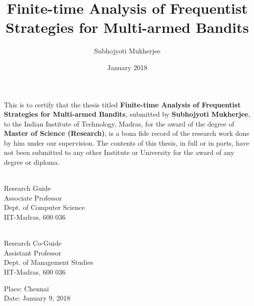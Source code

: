 \documentclass[MS,twoside]{iitmdiss}
\newcommand{\clearemptydoublepage}{\newpage{\cleardoublepage}}
\begin{document}

\title{Finite-time Analysis of Frequentist Strategies for Multi-armed Bandits}

\author{Subhojyoti Mukherjee}

\date{January 2018}

\maketitle



\clearemptydoublepage
\certificate

\vspace*{0.5in}

\noindent This is to certify that the thesis titled {\bf Finite-time Analysis of Frequentist Strategies for Multi-armed Bandits}, submitted by {\bf Subhojyoti Mukherjee}, 
  to the Indian Institute of Technology, Madras, for
the award of the degree of {\bf Master of Science (Research)}, is a bona fide
record of the research work done by him under our supervision.  The
contents of this thesis, in full or in parts, have not been submitted
to any other Institute or University for the award of any degree or
diploma.

\vspace*{1.5in}

\begin{singlespacing}
\hspace*{-0.25in}
\parbox{2.5in}{
 \\
\noindent Research Guide \\ 
\noindent Associate Professor \\
\noindent Dept. of Computer Science\\
\noindent IIT-Madras, 600 036 \\
} 
\hspace*{1.0in} 
\parbox{2.5in}{
 \\
\noindent Research Co-Guide \\ 
\noindent Assistant Professor \\
\noindent Dept.  of  Management Studies\\
\noindent IIT-Madras, 600 036 \\
}  
\end{singlespacing}
\vspace*{0.25in}
\noindent Place: Chennai\\
Date: January 9, 2018
\end{document}
